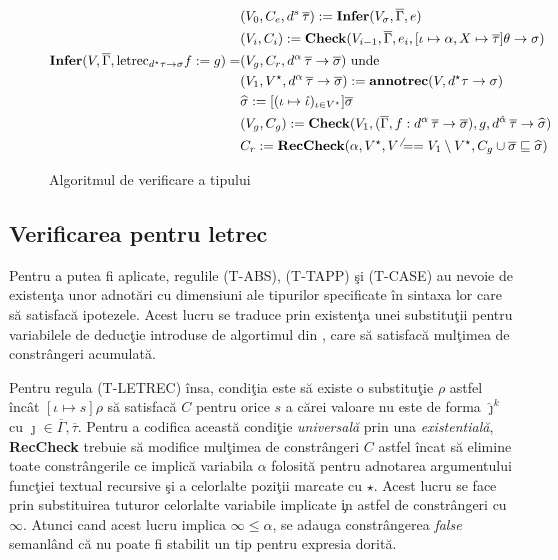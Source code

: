 \begin{figure}
\begin{align*}
    & (V_0, C_e, d^s\hspace{2pt} \overline{\tau}) := \textbf{Infer}(V_\sigma,\overline{\Gamma},e) \\
    & (V_i, C_i) := \textbf{Check}(V_{i-1},\overline{\Gamma}, e_i, [\iota \mapsto \alpha, X\mapsto \overline{\tau}] \theta \to \sigma)\\
\textbf{Infer}(V,\overline{\Gamma}, \text{letrec}_{d^{\star}\tau\to \sigma} f := g) =
    &(V_g,C_r,d^{\alpha}\hspace{2pt}\overline{\tau}\to\overline{\sigma})  \text{ unde } \\
    &(V_1, V^\star, d^\alpha\hspace{2pt}\overline{\tau}\to\overline{\sigma}) := \textbf{annotrec}(V,d^\star\tau\to\sigma) \\
    &\widehat{\sigma} := [(\iota \mapsto \hat{\iota})_{\iota\in V^\star}]\overline{\sigma}\\
    &(V_g, C_g) := \textbf{Check}(V_1,(\overline{\Gamma},f:d^{\alpha}\hspace{2pt}\overline{\tau}\to\overline{\sigma}),g,d^{\hat{\alpha}}
    \hspace{2pt} \overline{\tau} \to \widehat{\sigma} )\\
    & C_r := \textbf{RecCheck}(\alpha, V^\star,V^\neq=V_1\setminus V^\star,C_g \cup \overline{\sigma} \sqsubseteq \widehat{\sigma})
\end{align*}
\caption{Algoritmul de verificare a tipului}
\label{ver_alg}
\end{figure}

\subsection{Verificarea pentru letrec}
\done{}
Pentru a putea fi aplicate, regulile {\scriptsize (T-ABS), (T-TAPP)} \c si {\scriptsize (T-CASE)} au nevoie de existen\c ta unor adnot\u ari cu dimensiuni ale tipurilor specificate \^ in sintaxa lor care s\u a satisfac\u a ipotezele. Acest lucru se traduce prin existen\c ta unei substitu\c tii pentru variabilele de deduc\c tie introduse de algortimul din , care s\u a satisfac\u a mul\c timea de constr\^ angeri acumulat\u a.

Pentru regula {\scriptsize (T-LETREC)} \^ insa, condi\c tia este s\u a existe o substitu\c tie $\rho$ astfel \^ inc\^ at $[\iota \mapsto s]\rho$ s\u a satisfac\u a $C$ pentru orice $s$ a c\u arei valoare nu este de forma $\hat{\jmath}^k$ cu $\jmath \in \overline{\Gamma}, \overline{\tau}$. Pentru a codifica aceast\u a condi\c tie \emph{universal\u a} prin una \emph{existential\u a}, \textbf{RecCheck} trebuie s\u a modifice mul\c timea de constr\^ angeri $C$ astfel \^ incat s\u a elimine toate constr\^ angerile ce implic\u a variabila $\alpha$ folosit\u a pentru adnotarea argumentului func\c tiei textual recursive \c si a celorlalte pozi\c tii marcate cu $\star$. Acest lucru se face prin substituirea tuturor celorlalte variabile implicate \c in astfel de constr\^ angeri cu $\infty$. Atunci cand acest lucru implica $\infty \le \alpha$, se adauga constr\^ angerea \emph{false} semanl\^ and c\u a nu poate fi stabilit un tip pentru expresia dorit\u a.

